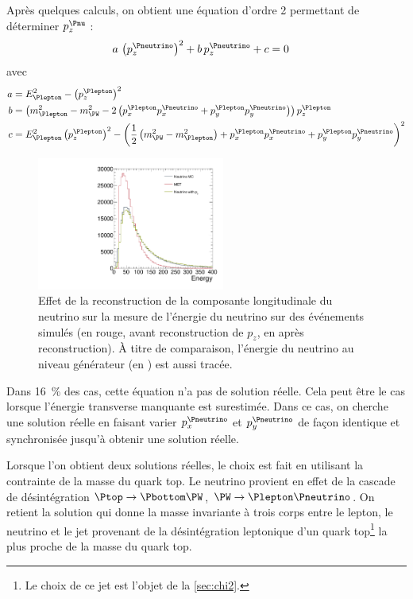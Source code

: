 Après quelques calculs, on obtient une équation d'ordre 2 permettant de déterminer $p_z^{\Pnu}$ :
\begin{align*}
  a \, \left( p_z^{{\Pneutrino}} \right)^2 + b \, p_z^{{\Pneutrino}} + c &= 0
\end{align*}
avec
\begin{align*}
  a &= E_{\Plepton}^2 - \left( p_z^{{\Plepton}} \right)^2 \\
  b &= \left( m_{\Plepton}^2 - m_{\PW}^2 - 2 \left( p_x^{\Plepton} p_x^{\Pneutrino} + p_y^{\Plepton} p_y^{\Pneutrino} \right) \right) p_z^{\Plepton} \\
  c &= E_{\Plepton}^2 \left( p_z^{\Plepton} \right)^2 - \left( \frac{1}{2} \left( m_{\PW}^2 - m_{\Plepton}^2 \right) + p_x^{\Plepton} p_x^{\Pneutrino} + p_y^{\Plepton} p_y^{\Pneutrino} \right)^2
\end{align*}

\begin{figure}[tbp]
    \centering
    \includegraphics[width=0.55\textwidth,origin=c,angle=-90]{chapitre6/figs/plot_met_energy.pdf}
    \caption{Effet de la reconstruction de la composante longitudinale du neutrino sur la mesure de l'énergie du neutrino sur des événements \ttbar simulés (en \textcolor{rouge_grandmere}{rouge}, avant reconstruction de $p_z$, en \vertc après reconstruction). À titre de comparaison, l'énergie du neutrino au niveau générateur (en \gris) est aussi tracée.}
    \label{fig:neutrino_correction}
\end{figure}

Dans \tilde\SI{16}{\%} des cas, cette équation n'a pas de solution réelle. Cela peut être le cas lorsque l'énergie transverse manquante est surestimée. Dans ce cas, on cherche une solution réelle en faisant varier $p_x^{\Pneutrino}$ et $p_y^{\Pneutrino}$ de façon identique et synchronisée jusqu'à obtenir une solution réelle.

Lorsque l'on obtient deux solutions réelles, le choix est fait en utilisant la contrainte de la masse du quark top. Le neutrino provient en effet de la cascade de désintégration $\Ptop \rightarrow \Pbottom \PW$, $\PW \rightarrow \Plepton \Pneutrino$. On retient la solution qui donne la masse invariante à trois corps entre le lepton, le neutrino et le jet \Pbottom provenant de la désintégration leptonique d'un quark top\footnote{Le choix de ce jet est l'objet de la \cref{sec:chi2}.} la plus proche de la masse du quark top.

